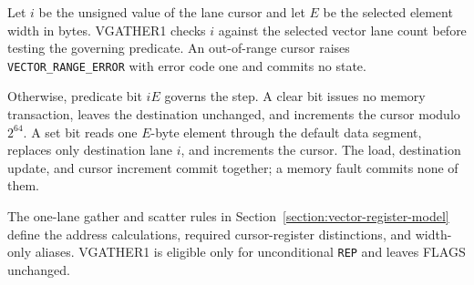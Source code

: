 Let $i$ be the unsigned value of the lane cursor and let $E$ be the selected
element width in bytes.  VGATHER1 checks $i$ against the selected vector lane
count before testing the governing predicate.  An out-of-range cursor raises
\texttt{VECTOR\_RANGE\_ERROR} with error code one and commits no state.

Otherwise, predicate bit $iE$ governs the step.  A clear bit issues no memory
transaction, leaves the destination unchanged, and increments the cursor
modulo $2^{64}$.  A set bit reads one $E$-byte element through the default data
segment, replaces only destination lane $i$, and increments the cursor.  The
load, destination update, and cursor increment commit together; a memory fault
commits none of them.

The one-lane gather and scatter rules in
Section~\ref{section:vector-register-model} define the address calculations,
required cursor-register distinctions, and width-only aliases.  VGATHER1 is
eligible only for unconditional \texttt{REP} and leaves FLAGS unchanged.
